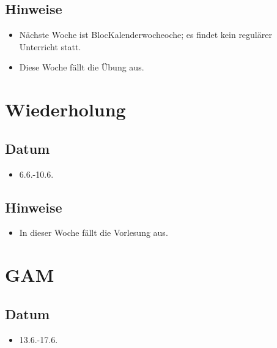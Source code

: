 \documentclass[
]{book}
\providecommand{\tightlist}{%
  \setlength{\itemsep}{0pt}\setlength{\parskip}{0pt}}
\begin{document}
\hypertarget{hinweise-3}{%
\subsection{Hinweise}\label{hinweise-3}}

\begin{itemize}
\tightlist
\item
  Nächste Woche ist BlocKalenderwocheoche; es findet kein regulärer Unterricht statt.
\item
  Diese Woche fällt die Übung aus.
\end{itemize}

\hypertarget{wiederholung-1}{%
\section{Wiederholung}\label{wiederholung-1}}

\hypertarget{datum-11}{%
\subsection{Datum}\label{datum-11}}

\begin{itemize}
\tightlist
\item
  6.6.-10.6.
\end{itemize}

\hypertarget{hinweise-4}{%
\subsection{Hinweise}\label{hinweise-4}}

\begin{itemize}
\tightlist
\item
  In dieser Woche fällt die Vorlesung aus.
\end{itemize}

\hypertarget{gam}{%
\section{GAM}\label{gam}}

\hypertarget{datum-12}{%
\subsection{Datum}\label{datum-12}}

\begin{itemize}
\tightlist
\item
  13.6.-17.6.
\end{itemize}
\end{document}
